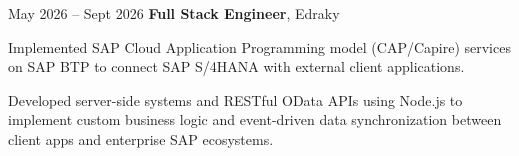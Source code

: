 \begin{twocolentry}{
            May 2026 – Sept 2026
        }
\textbf{Full Stack Engineer}, Edraky\end{twocolentry}

\vspace{0.10 cm}
\begin{onecolentry}
    \begin{highlights}
        \item Implemented SAP Cloud Application Programming model (CAP/Capire) services on SAP BTP to connect SAP S/4HANA with external client applications.
        \item Developed server-side systems and RESTful OData APIs using Node.js to implement custom business logic and event-driven data synchronization between client apps and enterprise SAP ecosystems.
    \end{highlights}
\end{onecolentry}